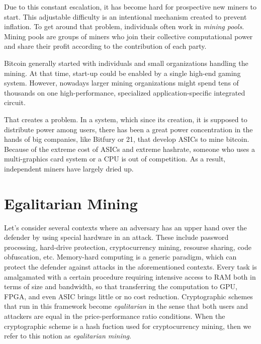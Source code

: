Due to this constant escalation, it has become hard for prospective new miners to start. This adjustable difficulty is an intentional mechanism created to prevent inflation. To get around that problem, individuals often work in \emph{mining pools}. Mining pools are groups of miners who join their collective computational power and share their profit according to the contribution of each party.

Bitcoin generally started with individuals and small organizations handling the mining. At that time, start-up could be enabled by a single high-end gaming system. However, nowadays larger mining organizations might spend tens of thousands on one high-performance, specialized application-specific integrated circuit.

That creates a problem. In a system, which since its creation, it is supposed to distribute power among users, there has been a great power concentration in the hands of big companies, like Bitfury or 21, that develop ASICs to mine bitcoin. Because of the extreme cost of ASICs and extreme hashrate, someone who uses a multi-graphics card system or a CPU is out of competition. As a result, independent miners have largely dried up.


%
\section{Egalitarian Mining} \label{sec:egalitarian}
Let's consider several contexts where an adversary has an upper hand over the defender by using special hardware in an attack. These include password processing, hard-drive protection, cryptocurrency mining, resourse sharing, code obfuscation, etc. Memory-hard computing is a generic paradigm, which can protect the defender against attacks in the aforementioned contexts. Every task is amalgamated with a certain procedure requiring intensive access to RAM both in terms of size and bandwidth, so that transferring the computation to GPU, FPGA, and even ASIC brings little or no cost reduction. Cryptographic schemes that run in this framework become \emph{egalitarian} in the sense that both users and attackers are equal in the price-performance ratio conditions. When the cryptographic scheme is a hash fuction used for cryptocurrency mining, then we refer to this notion as \emph{egalitarian mining}.

